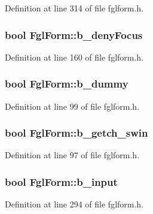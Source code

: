 Definition at line 314 of file fglform.h.

\hypertarget{classFglForm_a99b822401e45535d412f2a6c5601734d}{
\subsubsection[{b\_\-denyFocus}]{\setlength{\rightskip}{0pt plus 5cm}bool {\bf FglForm::b\_\-denyFocus}}}
\label{classFglForm_a99b822401e45535d412f2a6c5601734d}


Definition at line 160 of file fglform.h.

\hypertarget{classFglForm_a4dd283ca13e8a699e88783b2946b6841}{
\subsubsection[{b\_\-dummy}]{\setlength{\rightskip}{0pt plus 5cm}bool {\bf FglForm::b\_\-dummy}}}
\label{classFglForm_a4dd283ca13e8a699e88783b2946b6841}


Definition at line 99 of file fglform.h.

\hypertarget{classFglForm_ac6325d19f253fe4e7cdfbd50bd027c19}{
\subsubsection[{b\_\-getch\_\-swin}]{\setlength{\rightskip}{0pt plus 5cm}bool {\bf FglForm::b\_\-getch\_\-swin}}}
\label{classFglForm_ac6325d19f253fe4e7cdfbd50bd027c19}


Definition at line 97 of file fglform.h.

\hypertarget{classFglForm_a348ba4d61a2c9e18513ac88c919015c0}{
\subsubsection[{b\_\-input}]{\setlength{\rightskip}{0pt plus 5cm}bool {\bf FglForm::b\_\-input}}}
\label{classFglForm_a348ba4d61a2c9e18513ac88c919015c0}


Definition at line 294 of file fglform.h.

